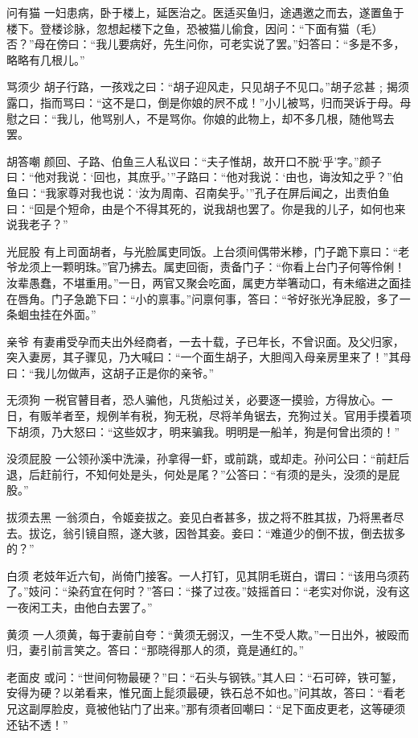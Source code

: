 \documentclass[12pt,UTF8]{ctexbook}
\begin{document}
问有猫
一妇患病，卧于楼上，延医治之。医适买鱼归，途遇邀之而去，遂置鱼于楼下。登楼诊脉，忽想起楼下之鱼，恐被猫儿偷食，因问：“下面有猫（毛）否？”母在傍曰：“我儿要病好，先生问你，可老实说了罢。”妇答曰：“多是不多，略略有几根儿。”

骂须少
胡子行路，一孩戏之曰：“胡子迎风走，只见胡子不见口。”胡子忿甚﹔揭须露口，指而骂曰：“这不是口，倒是你娘的屄不成！”小儿被骂，归而哭诉于母。母慰之曰：“我儿，他骂别人，不是骂你。你娘的此物上，却不多几根，随他骂去罢。

胡答嘲
颜回、子路、伯鱼三人私议曰：“夫子惟胡，故开口不脱‘乎’字。”颜子曰：“他对我说：‘回也，其庶乎。’”子路曰：“他对我说：‘由也，诲汝知之乎？”伯鱼曰：“我家尊对我也说：‘汝为周南、召南矣乎。’”孔子在屏后闻之，出责伯鱼曰：“回是个短命，由是个不得其死的，说我胡也罢了。你是我的儿子，如何也来说我老子？”

光屁股
有上司面胡者，与光脸属吏同饭。上台须间偶带米糁，门子跪下禀曰：“老爷龙须上一颗明珠。”官乃拂去。属吏回衙，责备门子：“你看上台门子何等伶俐！汝辈愚蠢，不堪重用。”一日，两官又聚会吃面，属吏方举箸动口，有未缩进之面挂在唇角。门子急跪下曰：“小的禀事。”问禀何事，答曰：“爷好张光净屁股，多了一条蛔虫挂在外面。”

亲爷
有妻甫受孕而夫出外经商者，一去十载，子已年长，不曾识面。及父归家，突入妻房，其子骤见，乃大喊曰：“一个面生胡子，大胆闯入母亲房里来了！”其母曰：“我儿勿做声，这胡子正是你的亲爷。”

无须狗
一税官瞽目者，恐人骗他，凡货船过关，必要逐一摸验，方得放心。一日，有贩羊者至，规例羊有税，狗无税，尽将羊角锯去，充狗过关。官用手摸着项下胡须，乃大怒曰：“这些奴才，明来骗我。明明是一船羊，狗是何曾出须的！”

没须屁股
一公领孙溪中洗澡，孙拿得一虾，或前跳，或却走。孙问公曰：“前赶后退，后赶前行，不知何处是头，何处是尾？”公答曰：“有须的是头，没须的是屁股。”

拔须去黑
一翁须白，令姬妾拔之。妾见白者甚多，拔之将不胜其拔，乃将黑者尽去。拔讫，翁引镜自照，遂大骇，因咎其妾。妾曰：“难道少的倒不拔，倒去拔多的？”

白须
老妓年近六旬，尚倚门接客。一人打钉，见其阴毛斑白，谓曰：“该用乌须药了。”妓问：“染药宜在何时？”答曰：“搽了过夜。”妓摇首曰：“老实对你说，没有这一夜闲工夫，由他白去罢了。”

黄须
一人须黄，每于妻前自夸：“黄须无弱汉，一生不受人欺。”一日出外，被殴而归，妻引前言笑之。答曰：“那晓得那人的须，竟是通红的。”

老面皮
或问：“世间何物最硬？”曰：“石头与钢铁。”其人曰：“石可碎，铁可錾，安得为硬？以弟看来，惟兄面上髭须最硬，铁石总不如也。”问其故，答曰：“看老兄这副厚脸皮，竟被他钻门了出来。”那有须者回嘲曰：“足下面皮更老，这等硬须还钻不透！”
\end{document}
